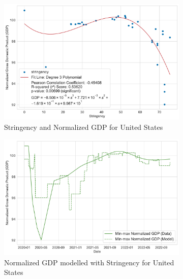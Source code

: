\documentclass[tikz,fleqn,12pt]{wlscirep}
\begin{document}
\begin{figure}[htbp!]
  \centering
  \begin{subfigure}[t]{0.48\textwidth}
    \centering
    \includegraphics[width=\linewidth]{images/stringency_vs_gdp_USA.pdf}
    \caption{Stringency and Normalized GDP for United States}
    \label{fig:stringency_vs_gdp_USA}
  \end{subfigure}
  \hfill
  \begin{subfigure}[t]{0.48\textwidth}
    \centering
    \includegraphics[width=\linewidth]{images/gdp_modelled_with_stringency_USA.pdf}
    \caption{Normalized GDP modelled with Stringency for United States}
    \label{fig:gdp_modelled_with_stringency_USA}
  \end{subfigure}
  \begin{subfigure}[t]{0.48\textwidth}
    \centering

\end{subfigure}
\end{figure}
\end{document}
